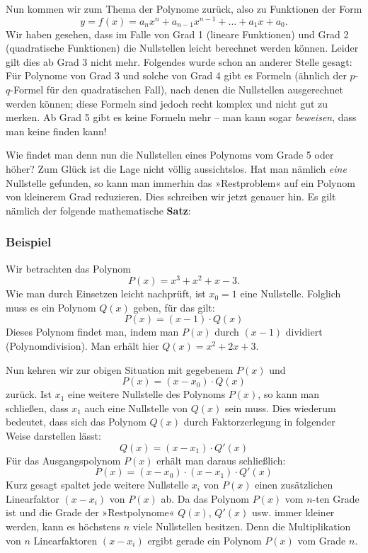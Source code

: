 Nun kommen wir zum Thema der Polynome zurück, also zu Funktionen der Form
\[ y = f(x) = a_n x^n + a_{n-1} x^{n-1} + \ldots + a_1 x + a_0 . \]
Wir haben gesehen, dass im Falle von Grad 1 (lineare Funktionen) und Grad 2 (quadratische Funktionen) die Nullstellen leicht berechnet werden können. Leider gilt dies ab Grad 3 nicht mehr. Folgendes wurde schon an anderer Stelle gesagt: Für Polynome von Grad 3 und solche von Grad 4 gibt es Formeln (ähnlich der $p$-$q$-Formel für den quadratischen Fall), nach denen die Nullstellen ausgerechnet werden können; diese Formeln sind jedoch recht komplex und nicht gut zu merken. Ab Grad 5 gibt es keine Formeln mehr -- man kann sogar \emph{beweisen}, dass man keine finden kann!

Wie findet man denn nun die Nullstellen eines Polynoms vom Grade 5 oder höher? Zum Glück ist die Lage nicht völlig aussichtslos. Hat man nämlich \emph{eine} Nullstelle gefunden, so kann man immerhin das »Restproblem« auf ein Polynom von kleinerem Grad reduzieren. Dies schreiben wir jetzt genauer hin. Es gilt nämlich der folgende mathematische \textbf{Satz}:


\subsubsection{Beispiel}

Wir betrachten das Polynom
\[ P(x) = x^3 + x^2 + x - 3 . \]
Wie man durch Einsetzen leicht nachprüft, ist $x_0 = 1$ eine Nullstelle. Folglich muss es ein Polynom $Q(x)$ geben, für das gilt:
\[ P(x) = (x - 1) \cdot Q(x) \]
Dieses Polynom findet man, indem man $P(x)$ durch $(x - 1)$ dividiert (Polynomdivision). Man erhält hier $Q(x) = x^2 + 2x + 3$.\beispielende

Nun kehren wir zur obigen Situation mit gegebenem $P(x)$ und
\[ P(x) = (x - x_0) \cdot Q(x) \]
zurück. Ist $x_1$ eine weitere Nullstelle des Polynoms $P(x)$, so kann man schließen, dass $x_1$ auch eine Nullstelle von $Q(x)$ sein muss. Dies wiederum bedeutet, dass sich das Polynom $Q(x)$ durch Faktorzerlegung in folgender Weise darstellen lässt:
\[ Q(x) = (x - x_1) \cdot Q'(x) \]
Für das Ausgangspolynom $P(x)$ erhält man daraus schließlich:
\[ P(x) = (x - x_0) \cdot (x - x_1) \cdot Q'(x) \]
Kurz gesagt spaltet jede weitere Nullstelle $x_i$ von $P(x)$ einen zusätzlichen Linearfaktor $(x - x_i)$ von $P(x)$ ab. Da das Polynom $P(x)$ vom $n$-ten Grade ist und die Grade der »Restpolynome« $Q(x)$, $Q'(x)$ usw. immer kleiner werden, kann es höchstens $n$ viele Nullstellen besitzen. Denn die Multiplikation von $n$ Linearfaktoren $(x - x_i)$ ergibt gerade ein Polynom $P(x)$ vom Grade $n$.

